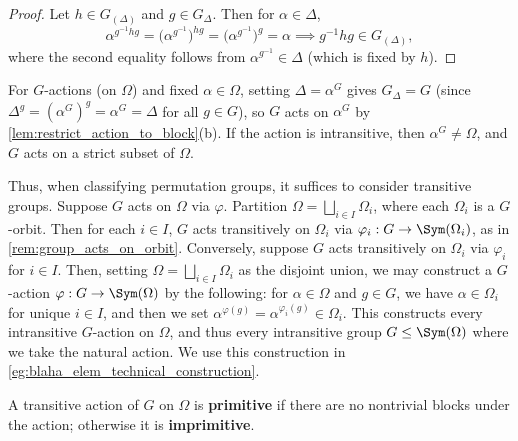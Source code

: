 {{        \begin{proof}
            Let $h \in G_{(\Delta)}$ and $g \in G_\Delta$. Then for $\alpha \in \Delta$,
            $$\alpha^{g^{-1}hg} = \big(\alpha^{g^{-1}}\big)^{hg} = \big(\alpha^{g^{-1}}\big)^g = \alpha \implies g^{-1}hg \in G_{(\Delta)},$$
            where the second equality follows from $\alpha^{g^{-1}} \in \Delta$ (which is fixed by $h$).
        \end{proof}

        \begin{remark}\label{rem:group_acts_on_orbit}
            For $G$-actions (on $\Omega$) and fixed $\alpha \in \Omega$, setting $\Delta = \alpha^G$ gives $G_\Delta = G$ (since $\Delta^g = (\alpha^G)^g = \alpha^G = \Delta$ for all $g \in G$), so $G$ acts on $\alpha^G$ by \autoref{lem:restrict_action_to_block}(b). If the action is intransitive, then $\alpha^G \neq \Omega$, and $G$ acts on a strict subset of $\Omega$.
        \end{remark}}

    Thus, when classifying permutation groups, it suffices to consider transitive groups. Suppose $G$ acts on $\Omega$ via $\varphi$. Partition $\Omega = \bigsqcup_{i \in I} \Omega_i$, where each $\Omega_i$ is a $G$-orbit. Then for each $i \in I$, $G$ acts transitively on $\Omega_i$ via $\varphi_i : G \to \Sym(\Omega_i)$, as in \autoref{rem:group_acts_on_orbit}. Conversely, suppose $G$ acts transitively on $\Omega_i$ via $\varphi_i$ for $i \in I$. Then, setting $\Omega = \bigsqcup_{i \in I} \Omega_i$ as the disjoint union, we may construct a $G$-action $\varphi : G \to \Sym(\Omega)$ by the following: for $\alpha \in \Omega$ and $g \in G$, we have $\alpha \in \Omega_i$ for unique $i \in I$, and then we set $\alpha^{\varphi(g)} = \alpha^{\varphi_i(g)} \in \Omega_i$. This constructs every intransitive $G$-action on $\Omega$, and thus every intransitive group $G \leq \Sym(\Omega)$ where we take the natural action. We use this construction in \autoref{eg:blaha_elem_technical_construction}.}

\begin{definition}\label{def:primitive_action}
    A transitive action of $G$ on $\Omega$ is \textbf{primitive} if there are no nontrivial blocks under the action; otherwise it is \textbf{imprimitive}.
\end{definition}

